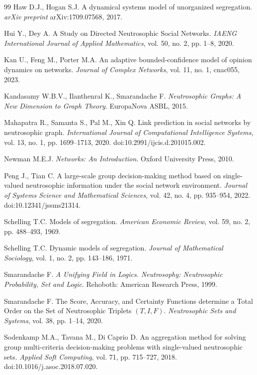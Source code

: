 \documentclass[11pt,a4paper]{article}
\begin{document}
\begin{thebibliography}{99}
		 Haw D.J., Hogan S.J. A dynamical systems model of unorganized segregation. \textit{arXiv preprint} arXiv:1709.07568, 2017.
		
		 Hui Y., Dey A. A Study on Directed Neutrosophic Social Networks. \textit{IAENG International Journal of Applied Mathematics}, vol. 50, no. 2, pp. 1--8, 2020.
		
		 Kan U., Feng M., Porter M.A. An adaptive bounded-confidence model of opinion dynamics on networks. \textit{Journal of Complex Networks}, vol. 11, no. 1, cnac055, 2023.
		
		 Kandasamy W.B.V., Ilanthenral K., Smarandache F. \textit{Neutrosophic Graphs: A New Dimension to Graph Theory}. EuropaNova ASBL, 2015.
		
		Mahapatra R., Samanta S., Pal M., Xin Q. Link prediction in social networks by neutrosophic graph. 
		\textit{International Journal of Computational Intelligence Systems}, vol. 13, no. 1, pp. 1699--1713, 2020. 
		doi:10.2991/ijcis.d.201015.002.
		
		 Newman M.E.J. \textit{Networks: An Introduction}. Oxford University Press, 2010.
		
		Peng J., Tian C. A large-scale group decision-making method based on single-valued neutrosophic information under the social network environment. 
		\textit{Journal of Systems Science and Mathematical Sciences}, vol. 42, no. 4, pp. 935--954, 2022. 
		doi:10.12341/jssms21314.
		
		 Schelling T.C. Models of segregation. \textit{American Economic Review}, vol. 59, no. 2, pp. 488--493, 1969.
		
		 Schelling T.C. Dynamic models of segregation. \textit{Journal of Mathematical Sociology}, vol. 1, no. 2, pp. 143--186, 1971.
		
		 Smarandache F. \textit{A Unifying Field in Logics. Neutrosophy: Neutrosophic Probability, Set and Logic}. Rehoboth: American Research Press, 1999.
		
		 Smarandache F. The Score, Accuracy, and Certainty Functions determine a Total Order on the Set of Neutrosophic Triplets $(T,I,F)$. \textit{Neutrosophic Sets and Systems}, vol. 38, pp. 1--14, 2020.
		
		Sodenkamp M.A., Tavana M., Di Caprio D. An aggregation method for solving group multi-criteria decision-making problems with single-valued neutrosophic sets. 
		\textit{Applied Soft Computing}, vol. 71, pp. 715--727, 2018. 
		doi:10.1016/j.asoc.2018.07.020.
		

\end{thebibliography}
\end{document}
